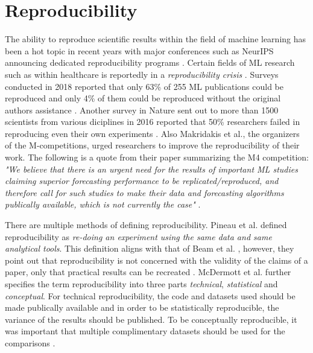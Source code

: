 \section{Reproducibility}
\label{sec:reproducibility}
The ability to reproduce scientific results within the field of machine learning has been a hot topic in recent years with major conferences such as NeurIPS announcing dedicated reproducibility programs \cite{pineau2020improving}. Certain fields of ML research such as within healthcare is reportedly in a \textit{reproducibility crisis} \cite{beam2020challenges, mcdermott2019reproducibility}. Surveys conducted in 2018 reported that only 63\% of 255 ML publications could be reproduced and only 4\% of them could be reproduced without the original authors assistance \cite{pineau2020improving}. Another survey in Nature sent out to more than 1500 scientists from various diciplines in 2016 reported that 50\% researchers failed in reproducing even their own experiments \cite{baker20161}. Also Makridakis et al., the organizers of the M-competitions, urged researchers to improve the reproducibility of their work. The following is a quote from their paper summarizing the M4 competition: \textit{"We believe that there is an urgent need for the results of important ML studies claiming superior forecasting performance to be replicated/reproduced, and therefore call for such studies to make their data and forecasting algorithms publically available, which is not currently the case"} \cite{makridakis_m4_2020}.

There are multiple methods of defining reproducibility. Pineau et al. \cite{pineau2020improving} defined reproducibility as \textit{re-doing an experiment using the same data and same analytical tools}. This definition aligns with that of Beam et al. \cite{beam2020challenges}, however, they point out that reproducibility is not concerned with the validity of the claims of a paper, only that practical results can be recreated \cite{beam2020challenges}. McDermott et al. further specifies the term reproducibility into three parts \textit{technical}, \textit{statistical} and \textit{conceptual}. For technical reproducibility, the code and datasets used should be made publically available and in order to be statistically reproducible, the variance of the results should be published. To be conceptually reproducible, it was important that multiple complimentary datasets should be used for the comparisons \cite{mcdermott2019reproducibility}.

